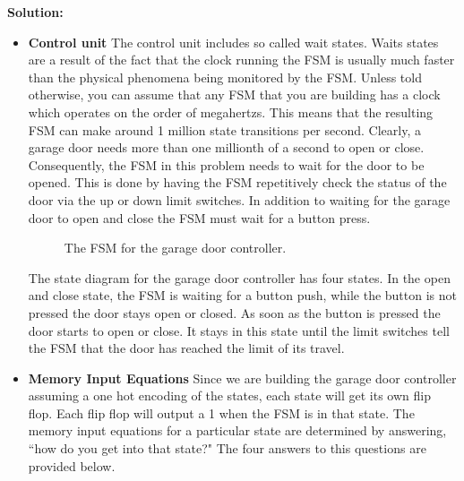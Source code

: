 \begin{enumerate}
        \begin{onlysolution}  \textbf{Solution:} \itshape{
                \begin{itemize}
                    \item\textbf{Control unit}
                        The control unit includes so called wait states.  Waits states are
                        a result of the fact that the clock running the FSM is usually
                        much faster than the physical phenomena being monitored by the FSM.
                        Unless told otherwise, you can assume that any FSM that you are
                        building has a clock which operates on the order of megahertzs.
                        This means that the resulting FSM can make around 1 million
                        state transitions per second.  Clearly, a garage door needs more
                        than one millionth of a second to open or close.  Consequently,
                        the FSM in this problem needs to wait for the door to be opened.
                        This is done by having the FSM repetitively check the status of the
                        door via the up or down limit switches.  In addition to waiting
                        for the garage door to open and close the FSM must wait for a
                        button press.

                        \begin{figure}[ht]
                            \caption{The FSM for the garage door controller.}
                        \end{figure}

                        The state diagram for the garage door controller has four states.
                        In the open and close state, the FSM is waiting for a button push,
                        while the button is not pressed the door stays open or closed.  As
                        soon as the button is pressed the door starts to open or close.
                        It stays in this state until the limit switches tell the FSM that
                        the door has reached the limit of its travel.

                    \item\textbf{Memory Input Equations}
                        Since we are building the garage door controller assuming a
                        one hot encoding of the states, each state will get its own
                        flip flop.  Each flip flop will output a 1 when the FSM is
                        in that state.  The memory input equations for a particular
                        state are determined by answering, ``how do you get into that
                        state?" The four answers to this questions are provided below.


\end{itemize}}
\end{onlysolution}
\end{enumerate}
